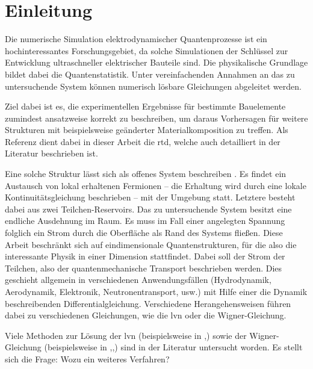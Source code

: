 \chapter{Einleitung}
\label{chap:einleitung}
Die numerische Simulation elektrodynamischer Quantenprozesse ist ein hochinteressantes Forschungsgebiet, da solche Simulationen der Schlüssel zur Entwicklung ultraschneller elektrischer Bauteile sind. Die physikalische Grundlage bildet dabei die Quantenstatistik. Unter vereinfachenden Annahmen an das zu untersuchende System können numerisch lösbare Gleichungen abgeleitet werden.

Ziel dabei ist es, die experimentellen Ergebnisse für bestimmte Bauelemente zumindest ansatzweise korrekt zu beschreiben, um daraus Vorhersagen für weitere Strukturen mit beispielsweise geänderter Materialkomposition zu treffen. Als Referenz dient dabei in dieser Arbeit die \ac{rtd}, welche auch detailliert in der Literatur \cite{wiedenhaus} beschrieben ist.

Eine solche Struktur lässt sich als offenes System beschreiben \cite{frensley}. Es findet ein Austausch von lokal erhaltenen Fermionen -- die Erhaltung wird durch eine lokale Kontinuitätsgleichung beschrieben -- mit der Umgebung statt. Letztere besteht dabei aus zwei Teilchen-Reservoirs. Das zu untersuchende System besitzt eine endliche Ausdehnung im Raum. Es muss im Fall einer angelegten Spannung folglich ein Strom durch die Oberfläche als Rand des Systems fließen. Diese Arbeit beschränkt sich auf eindimensionale Quantenstrukturen, für die also die interessante Physik in einer Dimension stattfindet. Dabei soll der Strom der Teilchen, also der quantenmechanische Transport beschrieben werden. Dies geschieht allgemein in verschiedenen Anwendungsfällen (Hydrodynamik, Aerodynamik, Elektronik, Neutronentransport, usw.) mit Hilfe einer die Dynamik beschreibenden Differentialgleichung. Verschiedene Herangehensweisen führen dabei zu verschiedenen Gleichungen, wie die \ac{lvn} oder die Wigner-Gleichung.

Viele Methoden zur Lösung der \ac{lvn}  (beispielsweise in \cite{frensley2},\cite{lukas1}) sowie der Wigner-Gleichung (beispielsweise in \cite{rossi1994monte},\cite{ringhofer},\cite{van2017efficient}) sind in der Literatur untersucht worden. Es stellt sich die Frage: Wozu ein weiteres Verfahren?

